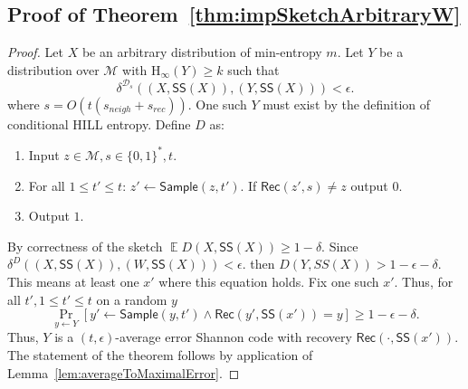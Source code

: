 \documentclass[11pt]{article}
\newcommand{\thref}[1]{\mbox{Theorem~\ref{#1}}}
\newcommand{\lemref}[1]{\mbox{Lemma~\ref{#1}}}
\DeclareMathOperator*{\expe}{\mathbb{E}}
\newcommand{\class}[1]{{\ensuremath{\mathsf{#1}}}}
\newcommand{\sketch}{\ensuremath{\class{SS}}\xspace}
\newcommand{\rec}{\ensuremath{\class{Rec}}\xspace}
\newcommand{\sample}{\ensuremath{\class{Sample}}\xspace}
\newcommand{\hill}{\ensuremath{\mathtt{HILL}}\xspace}
\newcommand{\Hoo}{\mathrm{H}_\infty}
\begin{document}
\subsection{Proof of \thref{thm:impSketchArbitraryW}}
\label{sec:proof of thm sketch implies code}
\begin{proof}
  Let $X$ be an arbitrary distribution of min-entropy $m$.  Let $Y$ be a distribution over $\mathcal{M}$ with $\Hoo(Y)\geq k$ such that 
\[ 
\delta^{\mathcal{D}_s}((X, \sketch(X)), (Y, \sketch(X)))<\epsilon.
\]  
where  $s = O(t(s_{neigh}+s_{rec}))$.  One such $Y$ must exist by the definition of conditional HILL entropy.
Define $D$ as:
\begin{enumerate}
\item Input $z\in\mathcal{M}, s \in\{0, 1\}^*, t$.
\item For all $1\leq t'\leq t$: 
\subitem  $z'\leftarrow \sample(z, t')$.
\subitem If $\rec(z', s) \neq  z$ output $0$.
\item Output $1$.
\end{enumerate}
  By correctness of the sketch $ \expe D(X, \sketch(X)) \ge 1-\delta$.  Since 
$\delta^D((X, \sketch(X)), (W, \sketch(X)))<\epsilon.$ then $D(Y, SS(X))>1-\epsilon-\delta$.  This means at least one $x'$ where this equation holds.  Fix one such $x'$.  
Thus, for all $t', 1\leq t'\leq t$ on a random $y$
\[ \Pr_{y\leftarrow Y}[y'\leftarrow \sample(y, t') \wedge \rec(y', \sketch(x')) = y]\geq 1-\epsilon-\delta.\]  
Thus,  $Y$ is a $(t, \epsilon)$-average error Shannon code with recovery $\rec(\cdot, \sketch(x'))$.  The statement of the theorem follows by application of \lemref{lem:averageToMaximalError}.  
\end{proof}
\end{document}
